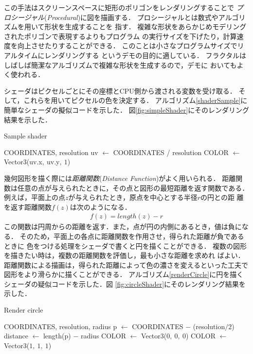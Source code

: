 この手法はスクリーンスペースに矩形のポリゴンをレンダリングすることで
\emph{プロシージャル}(\textit{Procedural})に図を描画する．
プロシージャルとは数式やアルゴリズムを用いて形状を生成することを
指す．
複雑な形状をあらかじめモデリングされたポリゴンで表現するよりもプログラム
の実行サイズを下げたり，計算速度を向上させたりすることができる．
このことは小さなプログラムサイズでリアルタイムにレンダリングする
というデモの目的に適している．
フラクタルはしばしば簡潔なアルゴリズムで複雑な形状を生成するので，デモに
おいてもよく使われる．

シェーダはピクセルごとにその座標とCPU側から渡される変数を受け取る．
そして，これらを用いてピクセルの色を決定する．
アルゴリズム\ref{shaderSample}に簡単なシェーダの擬似コードを示した．
図\ref{fig:simpleShader}にそのレンダリング結果を示した．
\begin{algorithm}
 \begin{algorithmic}
  \begin{minipage}{0.5\hsize}
   \caption{Sample shader}
   \label{shaderSample}
   \REQUIRE COORDINATES, resolution
   \STATE uv $\leftarrow$ COORDINATES / resolution
   \STATE COLOR $\leftarrow$ Vector3(uv.x$,~$uv.y$,~1$)
  \end{minipage}
 \end{algorithmic}
\end{algorithm}

幾何図形を描く際には\emph{距離関数}(\textit{Distance Function})がよく用いられる．
距離関数は任意の点が与えられたときに，その点と図形の最短距離を返す関数である．
例えば，平面上の点$z$が与えられたとき，原点を中心とする半径$r$の円との距
離を返す距離関数$f(z)$は次のようになる．
\begin{align*}
 f(z) =  length(z) - r
\end{align*}
この関数は円周からの距離を返す．また，点が円の内側にあるとき，値は負にな
る．
そのため，平面上の各点に距離関数を作用させ，得られた距離が負であるときに
色をつける処理をシェーダで書くと円を描くことができる．
複数の図形を描きたい時は，複数の距離関数を評価し，最も小さな距離を求めれ
ばよい．
距離関数による描画は，得られた距離によって色の濃さを変えるといった工夫で
図形をより滑らかに描くことができる．
アルゴリズム\ref{renderCircle}に円を描くシェーダの疑似コードを示した．図
\ref{fig:circleShader}にそのレンダリング結果を示した．

\begin{algorithm}
 \begin{algorithmic}
  \caption{Render circle}
  \label{renderCircle}
  \REQUIRE COORDINATES, resolution, radius
  \STATE p $\leftarrow$ COORDINATES $-$ (resolution$ / 2$)
  \STATE distance $\leftarrow$ length(p) $-$ radius
  \STATE COLOR $\leftarrow$ Vector3($0,~0,~0$)
  \ELSE
  \STATE COLOR $\leftarrow$ Vector3($1,~1,~1$)
  \ENDIF
 \end{algorithmic}
\end{algorithm}

